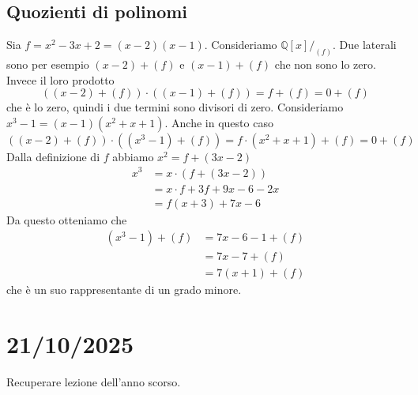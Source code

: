 \documentclass[a4paper]{article}
\begin{document}
\subsection{Quozienti di polinomi}

Sia \(f = x^2 - 3x + 2 = (x-2)(x-1)\).
Consideriamo \(\mathbb{Q}[x]/_{(f)}\).
Due laterali sono per esempio \((x-2) + (f)\)
e \((x-1) + (f)\) che non sono lo zero.
Invece il loro prodotto
\[
    \left((x-2) + (f)\right) \cdot
    \left((x-1) + (f)\right)
    = f + (f) = 0 + (f)
\]
che è lo zero, quindi i due termini sono divisori di zero.
Consideriamo \(x^3 - 1 = (x-1)(x^2 + x + 1)\).
Anche in questo caso
\[
    \left((x-2) + (f)\right) \cdot
    \left((x^3 - 1) + (f)\right) = f \cdot (x^2 + x + 1) + (f) = 0 + (f)
\]
Dalla definizione di \(f\) abbiamo \(x^2 = f + (3x-2)\)
\begin{align*}
    x^3 &= x \cdot (f + (3x-2)) \\
    &= x \cdot f + 3f + 9x-6-2x \\
    &= f(x+3) + 7x-6
\end{align*}
Da questo otteniamo che
\begin{align*}
    (x^3 - 1) + (f) &= 7x-6 - 1 + (f) \\
    &= 7x-7 + (f) \\
    &= 7(x+1) + (f)
\end{align*}
che è un suo rappresentante di un grado minore.

\pagebreak

\section{21/10/2025}

Recuperare lezione dell'anno scorso.

\end{document}
